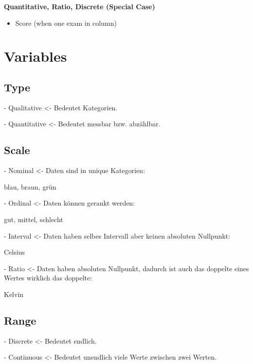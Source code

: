 \textbf{Quantitative, Ratio, Discrete (Special Case)}
\begin{itemize}
    \item Score (when one exam in column)
\end{itemize}

\section{Variables}

\subsection{Type}

- Qualitative <- Bedeutet Kategorien.

- Quantitative <- Bedeutet messbar bzw. abzählbar.

\subsection{Scale}

- Nominal <- Daten sind in unique Kategorien: 

blau, braun, grün

- Ordinal <- Daten können gerankt werden: 

gut, mittel, schlecht

- Interval <- Daten haben selbes Intervall aber keinen absoluten Nullpunkt: 

Celsius

- Ratio <- Daten haben absoluten Nullpunkt, dadurch ist auch das doppelte eines Wertes wirklich das doppelte: 

Kelvin

\subsection{Range}

- Discrete <- Bedeutet endlich.

- Continuous <- Bedeutet unendlich viele Werte zwischen zwei Werten.

